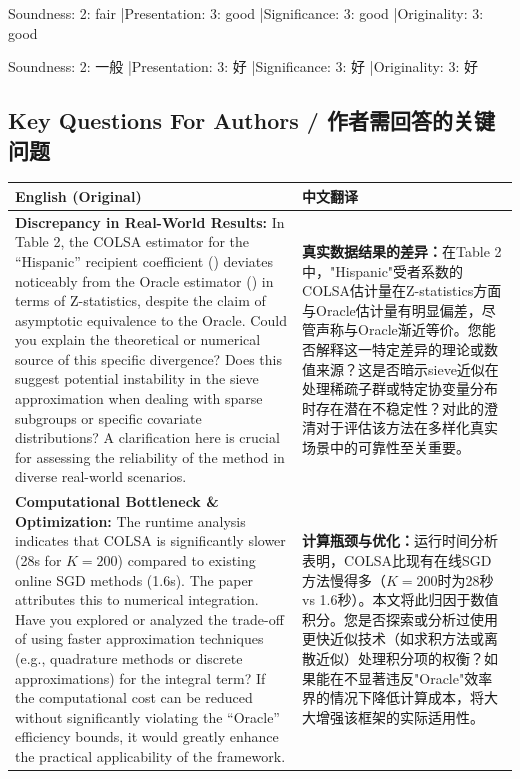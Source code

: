 \documentclass[10pt,a4paper]{article}
\begin{document}
\noindent Soundness: 2: fair \quad|\quad Presentation: 3: good \quad|\quad Significance: 3: good \quad|\quad Originality: 3: good

\noindent Soundness: 2: 一般 \quad|\quad Presentation: 3: 好 \quad|\quad Significance: 3: 好 \quad|\quad Originality: 3: 好

\subsection{Key Questions For Authors / 作者需回答的关键问题}

\begin{longtable}{L{0.48\textwidth}|L{0.48\textwidth}}
\hline
\textbf{English (Original)} & \textbf{中文翻译} \\
\hline
\textbf{Discrepancy in Real-World Results:} In Table 2, the COLSA estimator for the ``Hispanic'' recipient coefficient () deviates noticeably from the Oracle estimator () in terms of Z-statistics, despite the claim of asymptotic equivalence to the Oracle. Could you explain the theoretical or numerical source of this specific divergence? Does this suggest potential instability in the sieve approximation when dealing with sparse subgroups or specific covariate distributions? A clarification here is crucial for assessing the reliability of the method in diverse real-world scenarios.
&
\textbf{真实数据结果的差异：}在Table 2中，"Hispanic"受者系数的COLSA估计量在Z-statistics方面与Oracle估计量有明显偏差，尽管声称与Oracle渐近等价。您能否解释这一特定差异的理论或数值来源？这是否暗示sieve近似在处理稀疏子群或特定协变量分布时存在潜在不稳定性？对此的澄清对于评估该方法在多样化真实场景中的可靠性至关重要。 \\
\hline
\textbf{Computational Bottleneck \& Optimization:} The runtime analysis indicates that COLSA is significantly slower (28s for $K=200$) compared to existing online SGD methods (1.6s). The paper attributes this to numerical integration. Have you explored or analyzed the trade-off of using faster approximation techniques (e.g., quadrature methods or discrete approximations) for the integral term? If the computational cost can be reduced without significantly violating the ``Oracle'' efficiency bounds, it would greatly enhance the practical applicability of the framework.
&
\textbf{计算瓶颈与优化：}运行时间分析表明，COLSA比现有在线SGD方法慢得多（$K=200$时为28秒 vs 1.6秒）。本文将此归因于数值积分。您是否探索或分析过使用更快近似技术（如求积方法或离散近似）处理积分项的权衡？如果能在不显著违反"Oracle"效率界的情况下降低计算成本，将大大增强该框架的实际适用性。 \\

\end{longtable}
\end{document}
